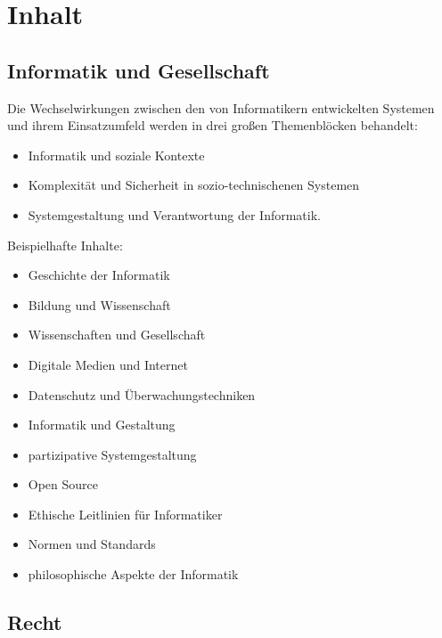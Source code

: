 \hypertarget{inhaltpathlabelmi-2017modulbeschreibungen-bachelorba_mug}{%
\section*{Inhalt\label{/mi-2017/modulbeschreibungen-bachelor/BA_MUG}}\label{inhaltpathlabelmi-2017modulbeschreibungen-bachelorba_mug}}

\hypertarget{informatik-und-gesellschaftpathlabelmi-2017modulbeschreibungen-bachelorba_mug}{%
\subsection*{Informatik und
Gesellschaft\label{/mi-2017/modulbeschreibungen-bachelor/BA_MUG}}\label{informatik-und-gesellschaftpathlabelmi-2017modulbeschreibungen-bachelorba_mug}}

Die Wechselwirkungen zwischen den von Informatikern entwickelten
Systemen und ihrem Einsatzumfeld werden in drei großen Themenblöcken
behandelt:

\begin{itemize}
\tightlist
\item
  Informatik und soziale Kontexte
\item
  Komplexität und Sicherheit in sozio-technischenen Systemen
\item
  Systemgestaltung und Verantwortung der Informatik.
\end{itemize}

Beispielhafte Inhalte:

\begin{itemize}
\tightlist
\item
  Geschichte der Informatik
\item
  Bildung und Wissenschaft
\item
  Wissenschaften und Gesellschaft
\item
  Digitale Medien und Internet
\item
  Datenschutz und Überwachungstechniken
\item
  Informatik und Gestaltung
\item
  partizipative Systemgestaltung
\item
  Open Source
\item
  Ethische Leitlinien für Informatiker
\item
  Normen und Standards
\item
  philosophische Aspekte der Informatik
\end{itemize}

\hypertarget{rechtpathlabelmi-2017modulbeschreibungen-bachelorba_mug}{%
\subsection*{Recht\label{/mi-2017/modulbeschreibungen-bachelor/BA_MUG}}\label{rechtpathlabelmi-2017modulbeschreibungen-bachelorba_mug}}

